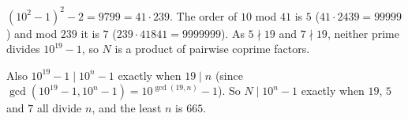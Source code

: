 $\left(10^2-1\right)^2-2=9799=41\cdot239$. The order of $10$ mod $41$ is $5$ ($41\cdot2439=99999$) and mod $239$ it is $7$ ($239\cdot41841=9999999$). As $5\nmid19$ and $7\nmid19$, neither prime divides $10^{19}-1$, so $N$ is a product of pairwise coprime factors.

Also $10^{19}-1\mid10^n-1$ exactly when $19\mid n$ (since $\gcd\left(10^{19}-1,10^n-1\right)=10^{\gcd(19,n)}-1$). So $N\mid10^n-1$ exactly when $19$, $5$ and $7$ all divide $n$, and the least $n$ is $\boxed{665}$.

